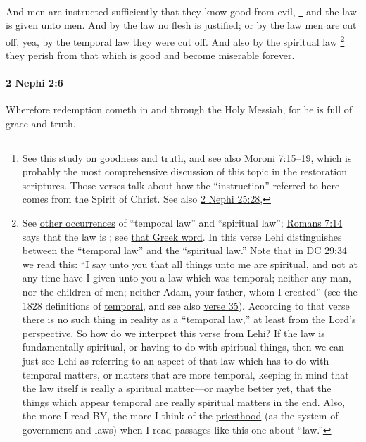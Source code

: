 			And men are instructed sufficiently that they know good from evil,%
				\footnote{%
					\label{2NEPHI-2-5-good}%
					See \hyperref[GOODNESS-truth]{this study} on goodness and truth, and see also \hyperref[MORONI-7-15]{Moroni 7:15--19}, which is probably the most comprehensive discussion of this topic in the restoration scriptures. Those verses talk about how the ``instruction'' referred to here comes from the Spirit of Christ. See also \hyperref[2NEPHI-25-28]{2 Nephi 25:28}, 
					}
			and the law is given unto men.
			And by the law no flesh is justified;
			or by the law men are cut off,
			yea, by the temporal law they were cut off.
			And also by the spiritual law%
				\footnote{%
					\label{2NEPHI-2-5-law}%
					See \hyperref[LAW-PHRASES]{other occurrences} of ``temporal law'' and ``spiritual law''; \hyperref[ROMANS-7-14]{Romans 7:14} says that the law is ; see \hyperref[PNEUMATIKOS]{that Greek word}.
					In this verse Lehi distinguishes between the ``temporal law'' and the ``spiritual law.'' Note that in \hyperref[DC29-34]{DC 29:34} we read this: ``I say unto you that all things unto me are spiritual, and not at any time have I given unto you a law which was temporal; neither any man, nor the children of men; neither Adam, your father, whom I created'' (see the 1828 definitions of \hyperref[TEMPORAL-1828]{temporal}, and see also \hyperref[DC29-35]{verse 35}). According to that verse there is no such thing in reality as a ``temporal law,'' at least from the Lord's perspective. So how do we interpret this verse from Lehi? If the law is fundamentally spiritual, or having to do with spiritual things, then we can just see Lehi as referring to an aspect of that law which has to do with temporal matters, or matters that are more temporal, keeping in mind that the law itself is really a spiritual matter---or maybe better yet, that the things which appear temporal are really spiritual matters in the end.
					Also, the more I read BY, the more I think of the \hyperref[PRIESTHOOD-BY]{priesthood} (as the system of government and laws) when I read passages like this one about ``law.''
					}
			they perish from that which is good
			and become miserable forever.

		\paragraph{2 Nephi 2:6} %
			\label{2NEPHI-2-6}

			Wherefore redemption cometh in and through the Holy Messiah,
			for he is full of grace and truth.
		
